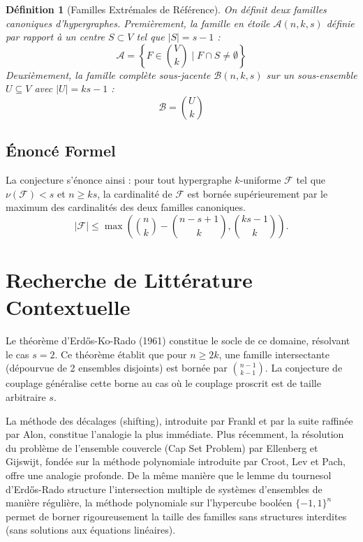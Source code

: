 \documentclass[12pt]{article}
\newtheorem{definition}{D\'efinition}
\begin{document}
\begin{definition}[Familles Extr\'emales de R\'ef\'erence]
On d\'efinit deux familles canoniques d'hypergraphes.
Premi\`erement, la famille en \'etoile $\mathcal{A}(n, k, s)$ d\'efinie par rapport \`a un centre $S \subset V$ tel que $|S| = s - 1$ :
$$ \mathcal{A} = \left\{ F \in \binom{V}{k} \mid F \cap S \neq \emptyset \right\} $$
Deuxi\`emement, la famille compl\`ete sous-jacente $\mathcal{B}(n, k, s)$ sur un sous-ensemble $U \subseteq V$ avec $|U| = ks - 1$ :
$$ \mathcal{B} = \binom{U}{k} $$
\end{definition}

\subsection{\'Enonc\'e Formel}
La conjecture s'\'enonce ainsi : pour tout hypergraphe $k$-uniforme $\mathcal{F}$ tel que $\nu(\mathcal{F}) < s$ et $n \ge ks$, la cardinalit\'e de $\mathcal{F}$ est born\'ee sup\'erieurement par le maximum des cardinalit\'es des deux familles canoniques.
$$ |\mathcal{F}| \le \max \left( \binom{n}{k} - \binom{n - s + 1}{k}, \binom{ks - 1}{k} \right). $$

\newpage
\section{Recherche de Litt\'erature Contextuelle}

Le th\'eor\`eme d'Erd\H{o}s-Ko-Rado (1961) constitue le socle de ce domaine, r\'esolvant le cas $s = 2$.
Ce th\'eor\`eme \'etablit que pour $n \ge 2k$, une famille intersectante (d\'epourvue de 2 ensembles disjoints) est born\'ee par $\binom{n-1}{k-1}$. La conjecture de couplage g\'en\'eralise cette borne au cas o\`u le couplage proscrit est de taille arbitraire $s$.

La m\'ethode des d\'ecalages (shifting), introduite par Frankl et par la suite raffin\'ee par Alon, constitue l'analogie la plus imm\'ediate. Plus r\'ecemment, la r\'esolution du probl\`eme de l'ensemble couvercle (Cap Set Problem) par Ellenberg et Gijswijt, fond\'ee sur la m\'ethode polynomiale introduite par Croot, Lev et Pach, offre une analogie profonde.
De la m\^eme mani\`ere que le lemme du tournesol d'Erd\H{o}s-Rado structure l'intersection multiple de syst\`emes d'ensembles de mani\`ere r\'eguli\`ere, la m\'ethode polynomiale sur l'hypercube bool\'een $\{-1, 1\}^n$ permet de borner rigoureusement la taille des familles sans structures interdites (sans solutions aux \'equations lin\'eaires).
\end{document}
